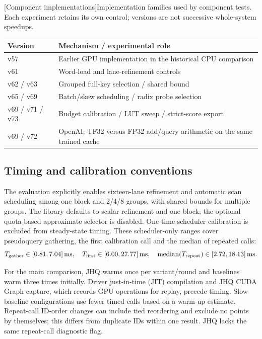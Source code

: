 \par\medskip\noindent\begin{minipage}{\linewidth}
\centering
\captionsetup{hypcap=false}
[Component implementations]{Implementation families used by component tests. Each experiment retains its own control; versions are not successive whole-system speedups.}
\label{tab:a-components}
\small\setlength{\tabcolsep}{4pt}
\begin{tabularx}{\linewidth}{@{}l>{\raggedright\arraybackslash}X@{}}
\toprule
Version & Mechanism / experimental role\\\midrule
v57 & Earlier GPU implementation in the historical CPU comparison\\
v61 & Word-load and lane-refinement controls\\
v62 / v63 & Grouped full-key selection / shared bound\\
v65 / v69 & Batch/skew scheduling / radix probe selection\\
v69 / v71 / v73 & Budget calibration / LUT sweep / strict-score export\\
v69 / v72 & OpenAI: TF32 versus FP32 add/query arithmetic on the same trained cache\\
\bottomrule
\end{tabularx}
\end{minipage}\par\medskip

\subsection{Timing and calibration conventions}
\label{sec:a-e1-protocol}
The evaluation explicitly enables sixteen-lane refinement and automatic
scan scheduling among one block and 2/4/8 groups, with shared bounds for
multiple groups. The library defaults to scalar refinement and one block;
the optional quota-based approximate selector is disabled. One-time
scheduler calibration is excluded from steady-state timing. These scheduler-only ranges cover
pseudoquery gathering, the first calibration call and the median of repeated calls:
\[
 T_{\rm gather}\in[0.81,7.04]\,\mathrm{ms},\quad
 T_{\rm first}\in[6.00,27.77]\,\mathrm{ms},\quad
 \operatorname{median}(T_{\rm repeat})\in[2.72,18.13]\,\mathrm{ms}.
\]

For the main comparison, JHQ warms once per variant/round and baselines warm three times
initially. Driver just-in-time (JIT) compilation and JHQ CUDA Graph
capture, which records GPU operations for replay, precede timing.
Slow baseline configurations use fewer timed calls based on a warm-up
estimate. Repeat-call ID-order changes can include tied reordering and
exclude no points by themselves; this differs from duplicate IDs within
one result. JHQ lacks the same repeat-call diagnostic flag.

